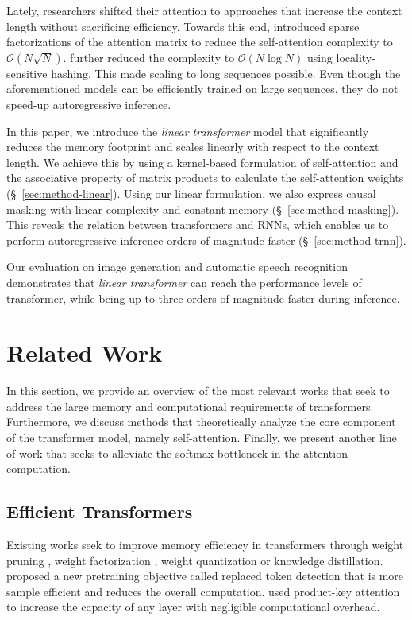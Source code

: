 Lately, researchers shifted their attention to approaches that increase the context length without sacrificing efficiency. Towards this end,
\citet{child2019generating} introduced sparse factorizations of the attention matrix to reduce the self-attention complexity to $\mathcal{O}\left(N\sqrt{N}\right)$.
\citet{kitaev2020reformer} further reduced the complexity to $\mathcal{O}\left(N \log N\right)$
using locality-sensitive hashing. This made scaling to long sequences possible. Even though the aforementioned models can be efficiently trained on large sequences, they do not speed-up autoregressive inference.

In this paper, we introduce the \emph{linear transformer} model that significantly reduces the memory footprint and scales linearly with respect to the context length. We achieve this by using a kernel-based formulation of self-attention and the associative property of matrix products to calculate the self-attention weights (\S~\ref{sec:method-linear}). Using our linear formulation, we also express causal masking with linear complexity and constant memory (\S~\ref{sec:method-masking}). This reveals the relation between transformers and RNNs, which enables us to perform autoregressive inference orders of magnitude faster (\S~\ref{sec:method-trnn}).

Our evaluation on image generation and automatic speech recognition demonstrates that \emph{linear transformer} can reach the performance levels of transformer, while being up to three orders of magnitude faster during inference.

\section{Related Work}

In this section, we provide an overview of the most relevant works that seek to address the large memory and computational requirements of transformers. Furthermore, we discuss methods that theoretically analyze the core component of the transformer model, namely self-attention. Finally, we present another line of work that seeks to alleviate the softmax bottleneck in the attention computation.

\subsection{Efficient Transformers}

Existing works seek to improve memory efficiency in transformers through weight pruning \cite{paul19}, weight factorization \cite{Lan2020}, weight quantization \cite{zafrir19} or knowledge distillation. \citet{clark2020electra} proposed a new pretraining objective called replaced token detection that is more sample efficient and reduces the overall computation. \citet{lample19} used product-key attention to increase the capacity of any layer with negligible computational overhead.

